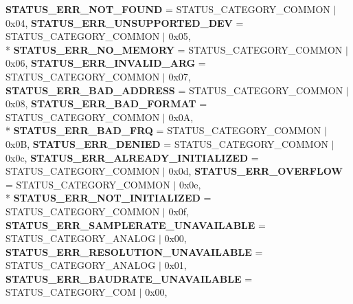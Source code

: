 \begin{DoxyCompactItemize}
{\bfseries S\+T\+A\+T\+U\+S\+\_\+\+E\+R\+R\+\_\+\+N\+O\+T\+\_\+\+F\+O\+U\+N\+D} = S\+T\+A\+T\+U\+S\+\_\+\+C\+A\+T\+E\+G\+O\+R\+Y\+\_\+\+C\+O\+M\+M\+O\+N $\vert$ 0x04, 
{\bfseries S\+T\+A\+T\+U\+S\+\_\+\+E\+R\+R\+\_\+\+U\+N\+S\+U\+P\+P\+O\+R\+T\+E\+D\+\_\+\+D\+E\+V} = S\+T\+A\+T\+U\+S\+\_\+\+C\+A\+T\+E\+G\+O\+R\+Y\+\_\+\+C\+O\+M\+M\+O\+N $\vert$ 0x05, 
\\*
{\bfseries S\+T\+A\+T\+U\+S\+\_\+\+E\+R\+R\+\_\+\+N\+O\+\_\+\+M\+E\+M\+O\+R\+Y} = S\+T\+A\+T\+U\+S\+\_\+\+C\+A\+T\+E\+G\+O\+R\+Y\+\_\+\+C\+O\+M\+M\+O\+N $\vert$ 0x06, 
{\bfseries S\+T\+A\+T\+U\+S\+\_\+\+E\+R\+R\+\_\+\+I\+N\+V\+A\+L\+I\+D\+\_\+\+A\+R\+G} = S\+T\+A\+T\+U\+S\+\_\+\+C\+A\+T\+E\+G\+O\+R\+Y\+\_\+\+C\+O\+M\+M\+O\+N $\vert$ 0x07, 
{\bfseries S\+T\+A\+T\+U\+S\+\_\+\+E\+R\+R\+\_\+\+B\+A\+D\+\_\+\+A\+D\+D\+R\+E\+S\+S} = S\+T\+A\+T\+U\+S\+\_\+\+C\+A\+T\+E\+G\+O\+R\+Y\+\_\+\+C\+O\+M\+M\+O\+N $\vert$ 0x08, 
{\bfseries S\+T\+A\+T\+U\+S\+\_\+\+E\+R\+R\+\_\+\+B\+A\+D\+\_\+\+F\+O\+R\+M\+A\+T} = S\+T\+A\+T\+U\+S\+\_\+\+C\+A\+T\+E\+G\+O\+R\+Y\+\_\+\+C\+O\+M\+M\+O\+N $\vert$ 0x0\+A, 
\\*
{\bfseries S\+T\+A\+T\+U\+S\+\_\+\+E\+R\+R\+\_\+\+B\+A\+D\+\_\+\+F\+R\+Q} = S\+T\+A\+T\+U\+S\+\_\+\+C\+A\+T\+E\+G\+O\+R\+Y\+\_\+\+C\+O\+M\+M\+O\+N $\vert$ 0x0\+B, 
{\bfseries S\+T\+A\+T\+U\+S\+\_\+\+E\+R\+R\+\_\+\+D\+E\+N\+I\+E\+D} = S\+T\+A\+T\+U\+S\+\_\+\+C\+A\+T\+E\+G\+O\+R\+Y\+\_\+\+C\+O\+M\+M\+O\+N $\vert$ 0x0c, 
{\bfseries S\+T\+A\+T\+U\+S\+\_\+\+E\+R\+R\+\_\+\+A\+L\+R\+E\+A\+D\+Y\+\_\+\+I\+N\+I\+T\+I\+A\+L\+I\+Z\+E\+D} = S\+T\+A\+T\+U\+S\+\_\+\+C\+A\+T\+E\+G\+O\+R\+Y\+\_\+\+C\+O\+M\+M\+O\+N $\vert$ 0x0d, 
{\bfseries S\+T\+A\+T\+U\+S\+\_\+\+E\+R\+R\+\_\+\+O\+V\+E\+R\+F\+L\+O\+W} = S\+T\+A\+T\+U\+S\+\_\+\+C\+A\+T\+E\+G\+O\+R\+Y\+\_\+\+C\+O\+M\+M\+O\+N $\vert$ 0x0e, 
\\*
{\bfseries S\+T\+A\+T\+U\+S\+\_\+\+E\+R\+R\+\_\+\+N\+O\+T\+\_\+\+I\+N\+I\+T\+I\+A\+L\+I\+Z\+E\+D} = S\+T\+A\+T\+U\+S\+\_\+\+C\+A\+T\+E\+G\+O\+R\+Y\+\_\+\+C\+O\+M\+M\+O\+N $\vert$ 0x0f, 
{\bfseries S\+T\+A\+T\+U\+S\+\_\+\+E\+R\+R\+\_\+\+S\+A\+M\+P\+L\+E\+R\+A\+T\+E\+\_\+\+U\+N\+A\+V\+A\+I\+L\+A\+B\+L\+E} = S\+T\+A\+T\+U\+S\+\_\+\+C\+A\+T\+E\+G\+O\+R\+Y\+\_\+\+A\+N\+A\+L\+O\+G $\vert$ 0x00, 
{\bfseries S\+T\+A\+T\+U\+S\+\_\+\+E\+R\+R\+\_\+\+R\+E\+S\+O\+L\+U\+T\+I\+O\+N\+\_\+\+U\+N\+A\+V\+A\+I\+L\+A\+B\+L\+E} = S\+T\+A\+T\+U\+S\+\_\+\+C\+A\+T\+E\+G\+O\+R\+Y\+\_\+\+A\+N\+A\+L\+O\+G $\vert$ 0x01, 
{\bfseries S\+T\+A\+T\+U\+S\+\_\+\+E\+R\+R\+\_\+\+B\+A\+U\+D\+R\+A\+T\+E\+\_\+\+U\+N\+A\+V\+A\+I\+L\+A\+B\+L\+E} = S\+T\+A\+T\+U\+S\+\_\+\+C\+A\+T\+E\+G\+O\+R\+Y\+\_\+\+C\+O\+M $\vert$ 0x00, 

\end{DoxyCompactItemize}
